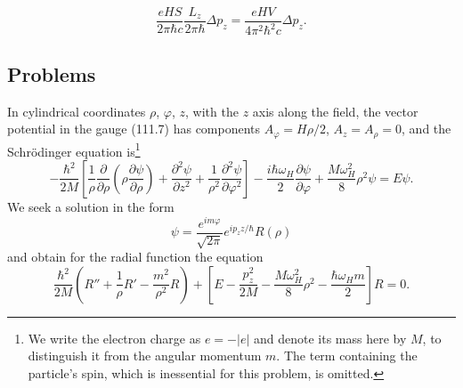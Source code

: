 
\begin{equation}
 \frac{eHS}{2\pi\hbar c}\frac{L_z}{2\pi\hbar}\Delta p_z=\frac{eHV}{4\pi^2\hbar^2c}\Delta p_z.
 \tag{112.10}
\end{equation}



\subsection*{Problems}



\SolutionHeading In cylindrical coordinates $\rho$, $\varphi$, $z$, with the $z$ axis along the field, the vector potential in the gauge (111.7) has components $A_\varphi=H\rho/2$, $A_z=A_\rho=0$, and the Schrödinger equation is\footnote{We write the electron charge as $e=-|e|$ and denote its mass here by $M$, to distinguish it from the angular momentum $m$. The term containing the particle's spin, which is inessential for this problem, is omitted.}
\begin{equation}
 -\frac{\hbar^2}{2M}\left[\frac1\rho\frac\partial{\partial\rho}\left(\rho\frac{\partial\psi}{\partial\rho}\right)+\frac{\partial^2\psi}{\partial z^2}+\frac1{\rho^2}\frac{\partial^2\psi}{\partial\varphi^2}\right]-\frac{i\hbar\omega_H}{2}\frac{\partial\psi}{\partial\varphi}+\frac{M\omega_H^2}{8}\rho^2\psi=E\psi.
 \tag{1}
\end{equation}
We seek a solution in the form
\[
 \psi=\frac{e^{im\varphi}}{\sqrt{2\pi}}e^{ip_zz/\hbar}R(\rho)
\]
and obtain for the radial function the equation
\[
 \frac{\hbar^2}{2M}\left(R''+\frac1\rho R'-\frac{m^2}{\rho^2}R\right)+\left[E-\frac{p_z^2}{2M}-\frac{M\omega_H^2}{8}\rho^2-\frac{\hbar\omega_Hm}{2}\right]R=0.
\]


